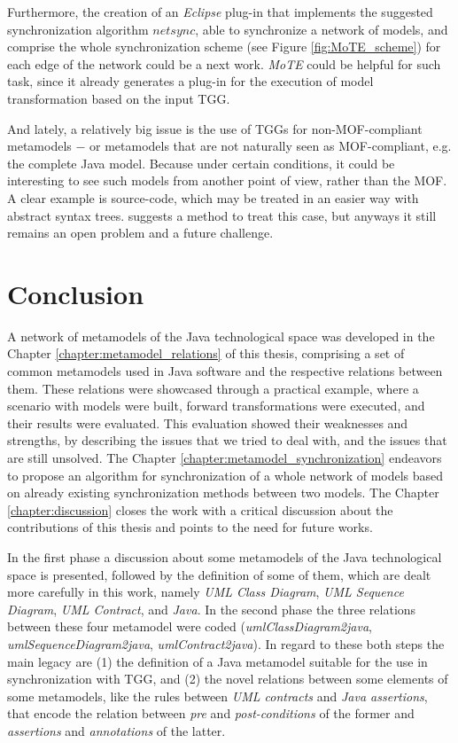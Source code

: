 \documentclass[tuberlin,cic,tc,english,noabntcite, oneside]{iiufrgs}
\begin{document}
Furthermore, the creation of an \emph{Eclipse} plug-in that implements the suggested synchronization algorithm $netsync$, able to synchronize a network of models, and comprise the whole synchronization scheme (see Figure \ref{fig:MoTE_scheme}) for each edge of the network could be a next work. \emph{MoTE} could be helpful for such task, since it already generates a plug-in for the execution of model transformation based on the input TGG.

And lately, a relatively big issue is the use of TGGs for non-MOF-compliant metamodels $-$ or metamodels that are not naturally seen as MOF-compliant, e.g. the complete Java model. Because under certain conditions, it could be interesting to see such models from another point of view, rather than the MOF. A clear example is source-code, which may be treated in an easier way with abstract syntax trees. \citet{angyal2008novel} suggests a method to treat this case, but anyways it still remains an open problem and a future challenge.

\chapter{Conclusion}
A network of metamodels of the Java technological space was developed in the Chapter \ref{chapter:metamodel_relations} of this thesis, comprising a set of common metamodels used in Java software and the respective relations between them. These relations were showcased through a practical example, where a scenario with models were built, forward transformations were executed, and their results were evaluated. This evaluation showed their weaknesses and strengths, by describing the issues that we tried to deal with, and the issues that are still unsolved. The Chapter \ref{chapter:metamodel_synchronization} endeavors to propose an algorithm for synchronization of a whole network of models based on already existing synchronization methods between two models. The Chapter \ref{chapter:discussion} closes the work with a critical discussion about the contributions of this thesis and points to the need for future works.

In the first phase a discussion about some metamodels of the Java technological space is presented, followed by the definition of some of them, which are dealt more carefully in this work, namely \emph{UML Class Diagram}, \emph{UML Sequence Diagram}, \emph{UML Contract}, and \emph{Java}. In the second phase the three relations between these four metamodel were coded (\emph{umlClassDiagram2java}, \emph{umlSequenceDiagram2java}, \emph{umlContract2java}). In regard to these both steps the main legacy are (1) the definition of a Java metamodel suitable for the use in synchronization with TGG, and (2) the novel relations between some elements of some metamodels, like the rules between \emph{UML contracts} and \emph{Java assertions}, that encode the relation between \emph{pre} and \emph{post-conditions} of the former and \emph{assertions} and \emph{annotations} of the latter.
\end{document}
